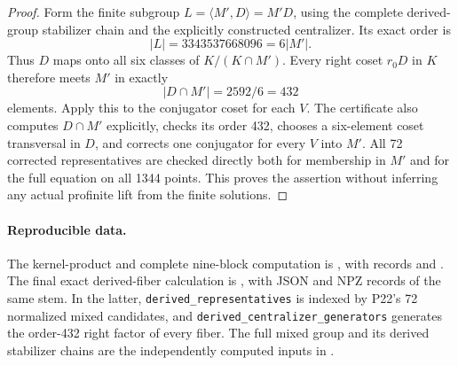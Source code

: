 \begin{proof}
Form the finite subgroup $L=\langle M',D\rangle=M'D$, using
the complete derived-group stabilizer chain and the explicitly
constructed centralizer.  Its exact order is
\[
        |L|=3343537668096=6|M'|.
\]
Thus $D$ maps onto all six classes of $K/(K\cap M')$.
Every right coset $r_0D$ in $K$ therefore meets $M'$ in exactly
\[
                   |D\cap M'|=2592/6=432
\]
elements.  Apply this to the conjugator coset for each $V$.
The certificate also computes $D\cap M'$ explicitly, checks
its order 432, chooses a six-element coset transversal in $D$,
and corrects one conjugator for every $V$ into $M'$.
All 72 corrected representatives are checked directly both
for membership in $M'$ and for the full equation on all
1344 points.  This proves the assertion without inferring
any actual profinite lift from the finite solutions.
\end{proof}

\paragraph{Reproducible data.}
The kernel-product and complete nine-block computation is
,
with records
and .
The final exact derived-fiber calculation is
,
with JSON and NPZ records of the same stem.  In the latter,
\texttt{derived\_representatives} is indexed by P22's 72
normalized mixed candidates, and
\texttt{derived\_centralizer\_generators} generates the
order-432 right factor of every fiber.  The full mixed group
and its derived stabilizer chains are the independently
computed inputs in
.
